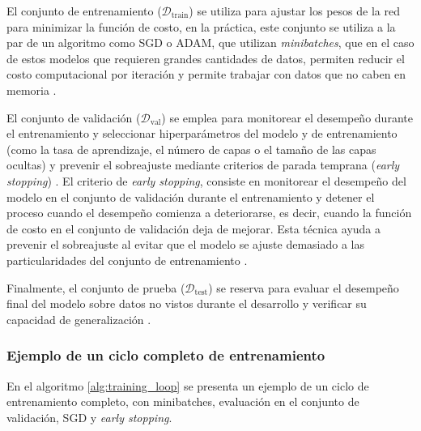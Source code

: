 El conjunto de entrenamiento ($\mathcal{D}_{\mathrm{train}}$) se utiliza para ajustar los pesos de la red para minimizar la función de costo, en la práctica, este conjunto se utiliza a la par de un algoritmo como SGD o ADAM, que utilizan \textit{minibatches}, que en el caso de estos modelos que requieren grandes cantidades de datos, permiten reducir el costo computacional por iteración y permite trabajar con datos que no caben en memoria \cite{Goodfellow2016}.

El conjunto de validación ($\mathcal{D}_{\mathrm{val}}$) se emplea para monitorear el desempeño durante el entrenamiento y seleccionar hiperparámetros del modelo y de entrenamiento (como la tasa de aprendizaje, el número de capas o el tamaño de las capas ocultas) y prevenir el sobreajuste mediante criterios de parada temprana (\textit{early stopping}) \cite{Goodfellow2016}. El criterio de \textit{early stopping}, consiste en monitorear el desempeño del modelo en el conjunto de validación durante el entrenamiento y detener el proceso cuando el desempeño comienza a deteriorarse, es decir, cuando la función de costo en el conjunto de validación deja de mejorar. Esta técnica ayuda a prevenir el sobreajuste al evitar que el modelo se ajuste demasiado a las particularidades del conjunto de entrenamiento \cite{Goodfellow2016}.

Finalmente, el conjunto de prueba ($\mathcal{D}_{\mathrm{test}}$) se reserva para evaluar el desempeño final del modelo sobre datos no vistos durante el desarrollo y verificar su capacidad de generalización \cite{vanderGoot2021}.

\subsubsection{Ejemplo de un ciclo completo de entrenamiento}
En el algoritmo \ref{alg:training_loop} se presenta un ejemplo de un ciclo de entrenamiento completo, con minibatches, evaluación en el conjunto de validación, SGD y \textit{early stopping}.

